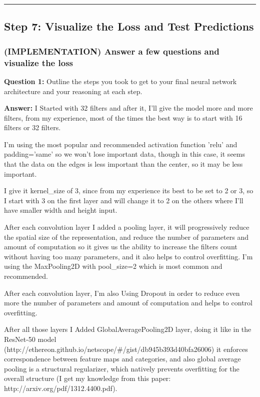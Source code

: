 \documentclass[11pt]{article}
\begin{document}
    \begin{center}\rule{0.5\linewidth}{\linethickness}\end{center}

\subsection{Step 7: Visualize the Loss and Test
Predictions}\label{step-7-visualize-the-loss-and-test-predictions}

    \subsubsection{(IMPLEMENTATION) Answer a few questions and visualize the
loss}\label{implementation-answer-a-few-questions-and-visualize-the-loss}

\textbf{Question 1:} Outline the steps you took to get to your final
neural network architecture and your reasoning at each step.

\textbf{Answer:} I Started with 32 filters and after it, I'll give the
model more and more filters, from my experience, most of the times the
best way is to start with 16 filters or 32 filters.

I'm using the most popular and recommended activation function 'relu'
and padding='same' so we won't lose important data, though in this case,
it seems that the data on the edges is less important than the center,
so it may be less important.

I give it kernel\_size of 3, since from my experience its best to be set
to 2 or 3, so I start with 3 on the first layer and will change it to 2
on the others where I'll have smaller width and height input.

After each convolution layer I added a pooling layer, it will
progressively reduce the spatial size of the representation, and reduce
the number of parameters and amount of computation so it gives us the
ability to increase the filters count without having too many
parameters, and it also helps to control overfitting. I'm using the
MaxPooling2D with pool\_size=2 which is most common and recommended.

After each convolution layer, I'm also Using Dropout in order to reduce
even more the number of parameters and amount of computation and helps
to control overfitting.

After all those layers I Added GlobalAveragePooling2D layer, doing it
like in the ResNet-50 model
(http://ethereon.github.io/netscope/\#/gist/db945b393d40bfa26006) it
enforces correspondence between feature maps and categories, and also
global average pooling is a structural regularizer, which natively
prevents overfitting for the overall structure (I get my knowledge from
this paper: http://arxiv.org/pdf/1312.4400.pdf).
\end{document}
